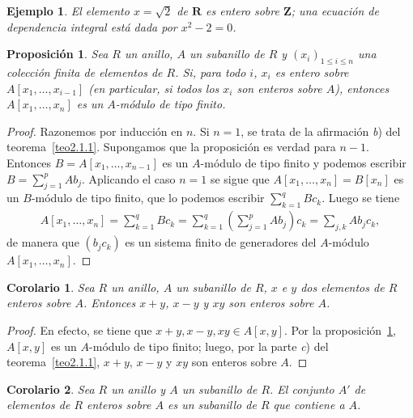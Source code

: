 \documentclass[10pt,oneside,bibtotoc,smallheadings,leqno,a5paper,DIV=12]{scrbook}
\newcommand{\RR}{\mathbf{R}}
\newcommand{\ZZ}{\mathbf{Z}}
\numberwithin{equation}{section}
\theoremstyle{defi}
\theoremstyle{enonce}
\newtheorem{proposition}{Proposici\'on}
\newtheorem{corollary}{Corolario}
\theoremstyle{rem}
\newtheorem*{example*}{Ejemplo}
\numberwithin{theorem}{section}
\numberwithin{proposition}{section}
\numberwithin{definition}{section}
\numberwithin{lemma}{section}
\numberwithin{corollary}{section}
\numberwithin{example}{section}
\numberwithin{footnote}{section}%
\begin{document}
\begin{example*}
El elemento $x = \sqrt{2}$ de $\RR$ es entero sobre $\ZZ$; una ecuaci\'on de dependencia
integral est\'a dada por $x^{2}-2 = 0$.
\end{example*}

\begin{proposition}\label{prop2.1.1}
Sea $R$ un anillo, $A$ un subanillo de $R$ y $(x_{i})_{1\leq i\leq n}$ una colecci\'on finita de elementos
de $R$. Si, para todo $i$, $x_{i}$ es entero sobre $A[x_{1},\dots,x_{i-1}]$ (en particular, si todos los
$x_{i}$ son enteros sobre $A$), entonces $A[x_{1},\dots,x_{n}]$ es un $A$-m\'odulo de tipo finito.
\end{proposition}

\begin{proof}
Razonemos por inducci\'on en $n$. Si $n=1$, se trata de la afirmaci\'on {\itshape b}) del teorema~\ref{teo2.1.1}. Supongamos que la
proposici\'on es verdad para $n-1$. Entonces $B = A[x_{1},\dots,x_{n-1}]$ es un $A$-m\'odulo de tipo finito
y podemos escribir $B = \sum_{j=1}^{p}Ab_{j}$. Aplicando el caso $n=1$ se sigue que $A[x_{1},\dots,x_{n}]
=B[x_{n}]$ es un $B$-m\'odulo de tipo finito, que lo podemos escribir $\sum_{k=1}^{q}Bc_{k}$. Luego se tiene
\begin{gather*}
A[x_{1},\dots,x_{n}] = \sum_{k=1}^{q}Bc_{k} = \sum_{k=1}^{q}\left(\sum_{j=1}^{p}Ab_{j}\right)c_{k} = \sum_{j,k}
Ab_{j}c_{k},
\end{gather*}
de manera que $(b_{j}c_{k})$ es un sistema finito de generadores del $A$-m\'odulo $A[x_{1},\dots,x_{n}]$.
\end{proof}

\begin{corollary}\label{cor2.1.1}
Sea $R$ un anillo, $A$ un subanillo de $R$, $x$ e $y$ dos elementos de $R$ enteros sobre $A$. Entonces
$x+y$, $x-y$ y $xy$ son enteros sobre $A$.
\end{corollary}

\begin{proof}
En efecto, se tiene que $x+y, x-y, xy\in A[x,y]$. Por la proposici\'on~\ref{prop2.1.1},
$A[x,y]$ es un $A$-m\'odulo
de tipo finito; luego, por la parte {\itshape c}) del teorema~\ref{teo2.1.1},
$x+y$, $x-y$ y $xy$ son enteros sobre $A$.
\end{proof}

\begin{corollary}\label{cor2.1.2}
Sea $R$ un anillo y $A$ un subanillo de $R$. El conjunto $A'$ de elementos de $R$ enteros sobre $A$
es un subanillo de $R$ que contiene a $A$.
\end{corollary}
\end{document}
